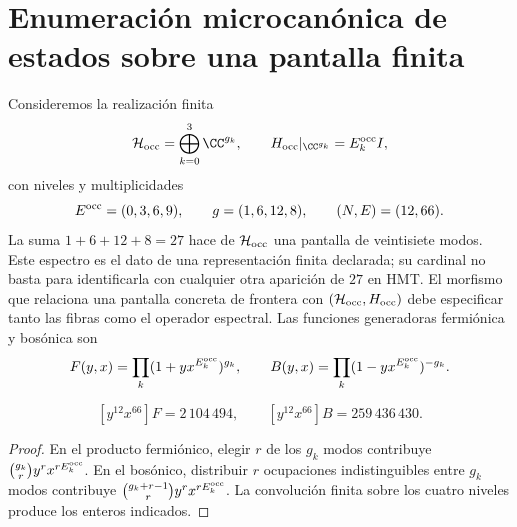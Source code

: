 \section{Enumeración microcanónica de estados sobre una pantalla finita}
\label{v:v:rec:ocupacion:section:01}

Consideremos la realización finita
\[
 \mathcal H_{\rm occ}=\bigoplus_{k=0}^{3}\CC^{g_k},
 \qquad
 H_{\rm occ}|_{\CC^{g_k}}=E_k^{\rm occ} I,
\]
con niveles y multiplicidades
\[
 E^{\rm occ}=(0,3,6,9),\qquad g=(1,6,12,8),
 \qquad(N,E)=(12,66).
\]
La suma \(1+6+12+8=27\) hace de \(\mathcal H_{\rm occ}\) una pantalla de
veintisiete modos. Este espectro es el dato de una representación finita
declarada; su cardinal no basta para identificarla con cualquier otra
aparición de \(27\) en HMT\@. El morfismo que relaciona una pantalla concreta
de frontera con \((\mathcal H_{\rm occ},H_{\rm occ})\) debe especificar tanto
las fibras como el operador espectral.
Las funciones generadoras fermiónica y bosónica son
\[
 F(y,x)=\prod_k(1+yx^{E_k^{\rm occ}})^{g_k},
 \qquad
 B(y,x)=\prod_k(1-yx^{E_k^{\rm occ}})^{-g_k}.
\]

\begin{proposition}
\label{v:v:rec:prop:cardinalidades-microcanonicas}
\[
 [y^{12}x^{66}]F=2\,104\,494,
 \qquad
 [y^{12}x^{66}]B=259\,436\,430.
\]
\end{proposition}
\begin{proof}
En el producto fermiónico, elegir \(r\) de los \(g_k\) modos contribuye
\(\binom{g_k}{r}y^rx^{rE_k^{\rm occ}}\). En el bosónico, distribuir \(r\)
ocupaciones indistinguibles entre \(g_k\) modos contribuye
\(\binom{g_k+r-1}{r}y^rx^{rE_k^{\rm occ}}\). La convolución finita sobre los
cuatro niveles produce los enteros indicados.
\end{proof}

